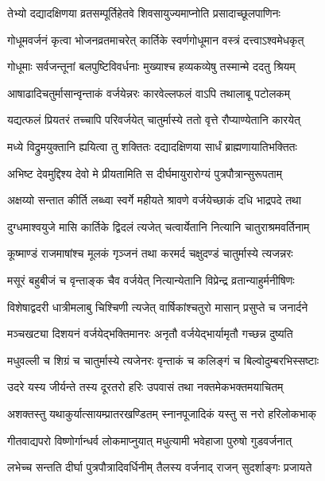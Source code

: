 \twolineshloka
{तेभ्यो दद्यादक्षिणया व्रतसम्पूर्तिहेतवे}
{शिवसायुज्यमाप्नोति प्रसादाच्छूलपाणिनः} %

\twolineshloka
{गोधूमवर्जनं कृत्वा भोजनव्रतमाचरेत्}
{कार्तिके स्वर्णगोधूमान वस्त्रं दत्त्वाऽश्वमेधकृत्} %

\twolineshloka
{गोधूमाः सर्वजन्तूनां बलपुष्टिविवर्धनाः}
{मुख्याश्च हव्यकव्येषु तस्मान्मे ददतु श्रियम्} %

\twolineshloka
{आषाढादिचतुर्मासान्वृन्ताकं वर्जयेन्नरः}
{कारवेल्लफलं वाऽपि तथालाबू पटोलकम्} %

\twolineshloka
{यद्यत्फलं प्रियतरं तच्चापि परिवर्जयेत्}
{चातुर्मास्ये ततो वृत्ते रौप्याण्येतानि कारयेत्} %

\twolineshloka
{मध्ये विद्रुमयुक्तानि ह्ययित्वा तु शक्तितः}
{दद्यादक्षिणया सार्धं ब्राह्मणायातिभक्तितः} %

\twolineshloka
{अभिष्ट देवमुद्दिश्य देवो मे प्रीयतामिति}
{स दीर्घमायुरारोग्यं पुत्रपौत्रान्सुरूपताम्} %

\twolineshloka
{अक्षय्यो सन्तात कीर्ति लब्ध्वा स्वर्गे महीयते}
{श्रावणे वर्जयेच्छाकं दधि भाद्रपदे तथा} %

\twolineshloka
{दुग्धमाश्वयुजे मासि कार्तिके द्विदलं त्यजेत्}
{चत्वार्येतानि नित्यानि चातुराश्रमवर्तिनाम्} %

\twolineshloka
{कूष्माण्डं राजमाषांश्च मूलकं गृञ्जनं तथा}
{करमर्द चक्षुदण्डं चातुर्मास्ये त्यजन्नरः} %

\twolineshloka
{मसूरं बहुबीजं च वृन्ताङ्क चैव वर्जयेत्}
{नित्यान्येतानि विप्रेन्द्र व्रतान्याहुर्मनीषिणः} %

\twolineshloka
{विशेषाद्वदरी धात्रीमलाबु चिश्चिणी त्यजेत्}
{वार्षिकांश्चतुरो मासान् प्रसुप्ते च जनार्दने} %

\twolineshloka
{मञ्चखट्या दिशयनं वर्जयेद्भक्तिमानरः}
{अनृतौ वर्जयेद्भार्यामृतौ गच्छन्न दुष्यति} %

\twolineshloka
{मधुवल्ली च शिग्रं च चातुर्मास्ये त्यजेनरः}
{वृन्ताकं च कलिङ्गं च बिल्वोदुम्बरभिस्सष्टाः} %

\twolineshloka
{उदरे यस्य जीर्यन्ते तस्य दूरतरो हरिः}
{उपवासं तथा नक्तमेकभक्तमयाचितम्} %

\twolineshloka
{अशक्तस्तु यथाकुर्यात्सायम्प्रातरखण्डितम्}
{स्नानपूजादिकं यस्तु स नरो हरिलोकभाक्} %

\twolineshloka
{गीतवाद्यपरो विष्णोर्गान्धर्व लोकमाप्नुयात्}
{मधुत्यामी भवेहाजा पुरुषो गुडवर्जनात्} %

\twolineshloka
{लभेच्च सन्तति दीर्घा पुत्रपौत्रादिवर्धिनीम्}
{तैलस्य वर्जनाद् राजन् सुदर्शाङ्गः प्रजायते} %


